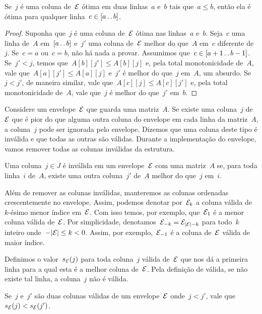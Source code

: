 \begin{lema} \label{Online:IntOpt}
Se~$j$ é uma coluna de~$\mathcal{E}$ ótima em duas linhas~$a$ e~$b$ tais que~$a \leq b$, então ela é ótima para qualquer linha~$c \in [a \,.\,.\, b]$.
\end{lema}

\begin{proof}
Suponha que~$j$ é uma coluna de~$\mathcal{E}$ ótima nas linhas~$a$ e~$b$. Seja~$c$ uma linha de~$A$ em~$[a \,.\,.\, b]$ e~$j'$ uma coluna de~$\mathcal{E}$ melhor do que~$A$ em~$c$ diferente de~$j$. Se~$c = a$ ou~$c = b$, não há nada a provar. Assumimos que~$c \in [a + 1 \,.\,.\, b - 1]$. Se~$j' < j$, temos que~$A[b][j'] \leq A[b][j]$ e, pela total monotonicidade de~$A$, vale que~$A[a][j'] \leq A[a][j]$ e~$j'$ é melhor do que~$j$ em~$A$, um absurdo. Se~$j < j'$, de maneira similar, vale que~$A[c][j] \leq A[c][j']$ e, pela total monotonicidade de~$A$, vale que~$j$ é melhor do que~$j'$ em~$b$.
\end{proof}

Considere um envelope~$\mathcal{E}$ que guarda uma matriz~$A$. Se existe uma coluna~$j$ de~$\mathcal{E}$ que é pior do que alguma outra coluna do envelope em cada linha da matriz~$A$, a coluna~$j$ pode ser ignorada pelo envelope. Dizemos que uma coluna deste tipo é inválida e que todas as outras são válidas. Durante a implementação do envelope, vamos remover todas as colunas inválidas da estrutura.

\begin{defi}
Uma coluna~${ j \in J }$ é inválida em um envelope~$\mathcal{E}$ com uma matriz~$A$ se, para toda linha~$i$ de~$A$, existe uma outra coluna~$j'$ de~$A$ melhor do que~$j$ em~$i$.
\end{defi}

Além de remover as colunas inválidas, manteremos as colunas ordenadas crescentemente no envelope. Assim, podemos denotar por~$\mathcal{E}_k$ a coluna válida de~$k$-ésimo menor índice em~$\mathcal{E}$. Com isso temos, por exemplo, que~$\mathcal{E}_1$ é a menor coluna válida de~$\mathcal{E}$. Por simplicidade, denotamos~$\mathcal{E}_{-k} = \mathcal{E}_{|\mathcal{E}|-k}$ para todo~$k$ inteiro onde~$-|\mathcal{E}| \leq k < 0$. Assim, por exemplo,~$\mathcal{E}_{-1}$ é a coluna de~$\mathcal{E}$ válida de maior índice.

Definimos o valor~$s_{\mathcal{E}}(j)$ para toda coluna~$j$ válida de~$\mathcal{E}$ que nos dá a primeira linha para a qual esta é a melhor coluna de~$\mathcal{E}$. Pela definição de válida, se não existe tal linha, a coluna~$j$ não é válida.

\begin{lema} \label{Online:Ordered}
Se~$j$ e~$j'$ são duas colunas válidas de um envelope~$\mathcal{E}$ onde~$j < j'$, vale que~${ s_{\mathcal{E}}(j) < s_{\mathcal{E}}(j') }$.
\end{lema}

